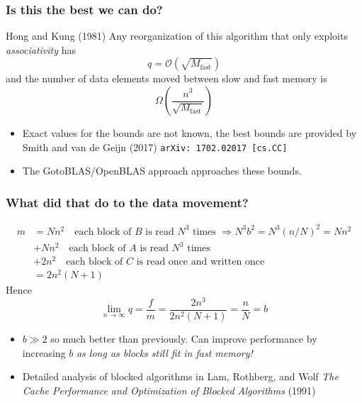 \documentclass[dvipsnames,presentation,aspectratio=169,14pt]{beamer}
\begin{document}
\begin{frame}
  \frametitle{Is this the best we can do?}
  \begin{theorem}{Hong and Kung (1981)}
    Any reorganization of this algorithm that only exploits
    \emph{associativity} has
    \begin{equation*}
      q = \mathcal{O}(\sqrt{M_\text{fast}})
    \end{equation*}
    and the number of data elements moved between slow and fast memory
    is
    \begin{equation*}
      \Omega\left(\frac{n^3}{\sqrt{M_\text{fast}}}\right)
    \end{equation*}
  \end{theorem}

  \begin{itemize}
  \item Exact values for the bounds are not known, the best bounds are
    provided by Smith and van de Geijn (2017) \texttt{arXiv:
      1702.02017 [cs.CC]}
  \item The GotoBLAS/OpenBLAS approach approaches these bounds.
  \end{itemize}
\end{frame}
\begin{frame}
  \frametitle{What did that do to the data movement?}
  \begin{align*}
    m &= N n^2 \quad \text{each block of $B$ is read $N^3$ times
        $\Rightarrow N^3 b^2 = N^3 (n/N)^2 = N n^2$}\\
      &+ N n^2 \quad \text{each block of $A$ is read $N^3$ times}\\
      &+ 2 n^2 \quad \text{each block of $C$ is read once and written
        once}\\
      &= 2n^2(N+1)
  \end{align*}
  Hence
  \begin{equation*}
    \lim_{n\to\infty} q = \frac{f}{m} = \frac{2 n^3}{2n^2(N + 1)} =
    \frac{n}{N} = b
  \end{equation*}


  \begin{itemize}
  \item $b \gg 2$ so much better than previously. Can improve
    performance by increasing $b$ \emph{as long as blocks still fit in
      fast memory!}
  \item Detailed analysis of blocked algorithms in Lam, Rothberg, and
    Wolf \emph{The Cache Performance and Optimization of Blocked
      Algorithms} (1991)
  \end{itemize}
\end{frame}
\end{document}
